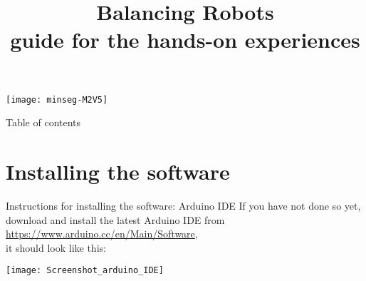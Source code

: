 \newif	\ifexternalize					%
\newif	\ifshowonlynotes				%
\newif	\ifhandout						%
\newif	\ifshowsolutions				%
\newif	\ifshownotes					%
\ifdefined\EXTERNALIZE	\externalizetrue	\fi						%
\ifdefined\ONLYNOTES	\showonlynotestrue	\fi						%
\ifdefined\HANDOUT		\handouttrue		\fi						%
\ifdefined\SOLUTIONS	\showsolutionstrue	\fi						%
\ifdefined\NOTES		\shownotestrue		\fi						%
\title		[Balancing Robots]	{Balancing Robots \\ guide for the hands-on experiences}
\date		{} %


\begin{frame}
	\titlepage
	\vspace{-1.9cm} 
	\begin{center}
		\texttt{[image: minseg-M2V5]}
	\end{center}
\end{frame}


\begin{frame}{Table of contents}
	\tableofcontents
\end{frame}


\section{Installing the software}


\begin{frame}[t]{Instructions for installing the software: Arduino IDE}
	If you have not done so yet, download and install the latest Arduino IDE from \url{https://www.arduino.cc/en/Main/Software}, \\ it should look like this:
	\begin{center}
		\texttt{[image: Screenshot\_arduino\_IDE]}
	\end{center}
\end{frame}

